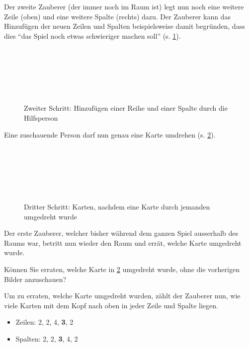 Der zweite Zauberer (der immer noch im Raum ist) legt nun noch eine weitere Zeile (oben) und eine weitere Spalte (rechts) dazu. Der Zauberer kann das Hinzufügen der neuen Zeilen und Spalten beispielsweise damit begründen, dass dies ``das Spiel noch etwas schwieriger machen soll'' (s. \cref{fig:zauberer-2}).

\begin{figure}[H]
\centering
{}\\
\\
\\
\\
\\
\caption{Zweiter Schritt: Hinzufügen einer Reihe und einer Spalte durch die Hilfsperson}
\label{fig:zauberer-2}
\end{figure}

Eine zuschauende Person darf nun genau eine Karte umdrehen (s. \cref{fig:zauberer-3}).
\begin{figure}[H]
\centering
{}\\
\\
\\
\\
\\
\caption{Dritter Schritt: Karten, nachdem eine Karte durch jemanden umgedreht wurde}
\label{fig:zauberer-3}
\end{figure}
Der erste Zauberer, welcher bisher während dem ganzen Spiel ausserhalb des Raums war, betritt nun wieder den Raum und errät, welche Karte umgedreht wurde.

\begin{mychallenge}
Können Sie erraten, welche Karte in \cref{fig:zauberer-3} umgedreht wurde, ohne die vorherigen Bilder anzuschauen?
\end{mychallenge}

Um zu erraten, welche Karte umgedreht wurden, zählt der Zauberer nun, wie viele Karten mit dem Kopf nach oben in jeder Zeile und Spalte liegen.
\begin{itemize}
\item Zeilen: 2, 2, 4, \textbf{3}, 2
\item Spalten: 2, 2, \textbf{3}, 4, 2
\end{itemize}


